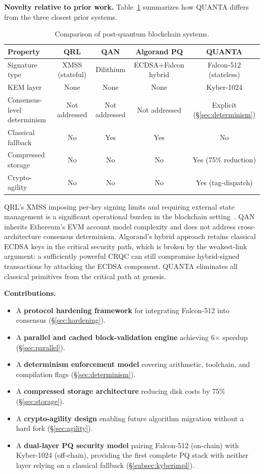 \documentclass[11pt,a4paper]{article}
\begin{document}
\textbf{Novelty relative to prior work.}
Table~\ref{tab:comparison} summarizes how QUANTA differs from the three closest prior systems.

\begin{table}[h]
\centering
\small
\begin{tabular}{@{}lcccc@{}}
\toprule
\textbf{Property} & \textbf{QRL} & \textbf{QAN} & \textbf{Algorand PQ} & \textbf{QUANTA} \\
\midrule
Signature type & XMSS (stateful) & Dilithium & ECDSA+Falcon hybrid & Falcon-512 (stateless) \\
KEM layer & None & None & None & Kyber-1024 \\
Consensus-level determinism & Not addressed & Not addressed & Not addressed & Explicit (\S\ref{sec:determinism}) \\
Classical fallback & No & Yes & Yes & No \\
Compressed storage & No & No & No & Yes (75\% reduction) \\
Crypto-agility & No & No & No & Yes (tag-dispatch) \\
\bottomrule
\end{tabular}
\caption{Comparison of post-quantum blockchain systems.}
\label{tab:comparison}
\end{table}

QRL's XMSS imposing per-key signing limits and requiring external
state management is a significant operational burden in the blockchain
setting~\cite{hulsing2018}. QAN inherits Ethereum's EVM account model
complexity and does not address cross-architecture consensus determinism.
Algorand's hybrid approach retains classical ECDSA keys in the critical
security path, which is broken by the weakest-link argument: a sufficiently
powerful CRQC can still compromise hybrid-signed transactions by attacking the
ECDSA component. QUANTA eliminates all classical primitives from the critical
path at genesis.

\textbf{Contributions.}
\begin{itemize}
  \item A \textbf{protocol hardening framework} for integrating Falcon-512 into consensus (\S\ref{sec:hardening}).
  \item A \textbf{parallel and cached block-validation engine} achieving 6$\times$ speedup (\S\ref{sec:parallel}).
  \item A \textbf{determinism enforcement model} covering arithmetic, toolchain, and compilation flags (\S\ref{sec:determinism}).
  \item A \textbf{compressed storage architecture} reducing disk costs by 75\% (\S\ref{sec:storage}).
  \item A \textbf{crypto-agility design} enabling future algorithm migration without a hard fork (\S\ref{sec:agility}).
  \item A \textbf{dual-layer PQ security model} pairing Falcon-512 (on-chain) with Kyber-1024 (off-chain), providing the first complete PQ stack with neither layer relying on a classical fallback (\S\ref{subsec:kyberimpl}).
\end{itemize}
\end{document}
